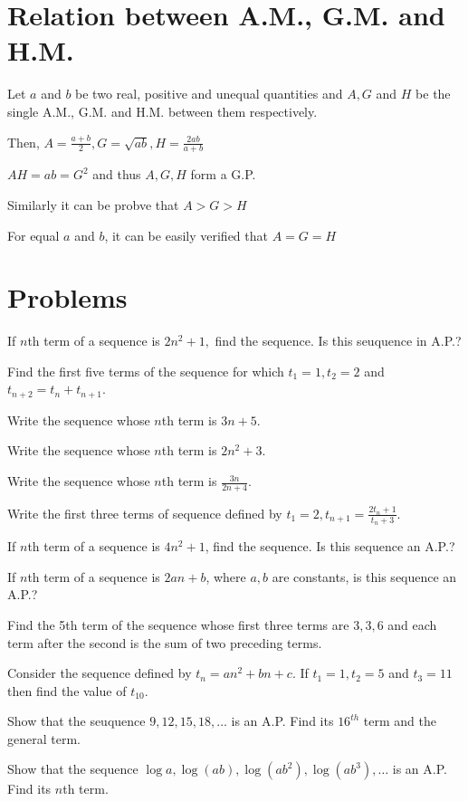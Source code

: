 \section{Relation between A.M., G.M. and H.M.}
Let $a$ and $b$ be two real, positive and unequal quantities and $A, G$ and $H$ be the single A.M., G.M. and H.M. between them
respectively.

Then, $A = \frac{a + b}{2}, G = \sqrt{ab}, H = \frac{2ab}{a + b}$

$AH = ab = G^2$ and thus $A, G, H$ form a G.P.

Similarly it can be probve that $A > G > H$

For equal $a$ and $b$, it can be easily verified that $A = G = H$

\section{Problems}
\startitemize[n, 2*broad]
\item If $n$th term of a sequence is $2n^2 + 1,$ find the sequence. Is this seuquence in A.P.?
\item Find the first five terms of the sequence for which $t_1 = 1, t_2 = 2$ and $t_{n + 2} = t_n + t_{n + 1}$.
\item Write the sequence whose $n$th term is $3n + 5$.
\item Write the sequence whose $n$th term is $2n^2 + 3$.
\item Write the sequence whose $n$th term is $\frac{3n}{2n + 4}$.
\item Write the first three terms of sequence defined by $t_1 = 2, t_{n + 1} = \frac{2t_n + 1}{t_n + 3}$.
\item If $n$th term of a sequence is $4n^2 + 1$, find the sequence. Is this sequence an A.P.?
\item If $n$th term of a sequence is $2an + b$, where $a, b$ are constants, is this sequence an A.P.?
\item Find the 5th term of the sequence whose first three terms are $3, 3, 6$ and each term after the second is the sum of two
  preceding terms.
\item Consider the sequence defined by $t_n = an^2 + bn + c$. If $t_1 = 1, t_2 = 5$ and $t_3 = 11$ then find the value of
  $t_{10}$.
\item Show that the seuquence $9, 12, 15, 18, \ldots$ is an A.P. Find its $16^{th}$ term and the general term.
\item Show that the sequence $\log a, \log (ab), \log(ab^2), \log (ab^3), \ldots$ is an A.P. Find its $n$th term.
